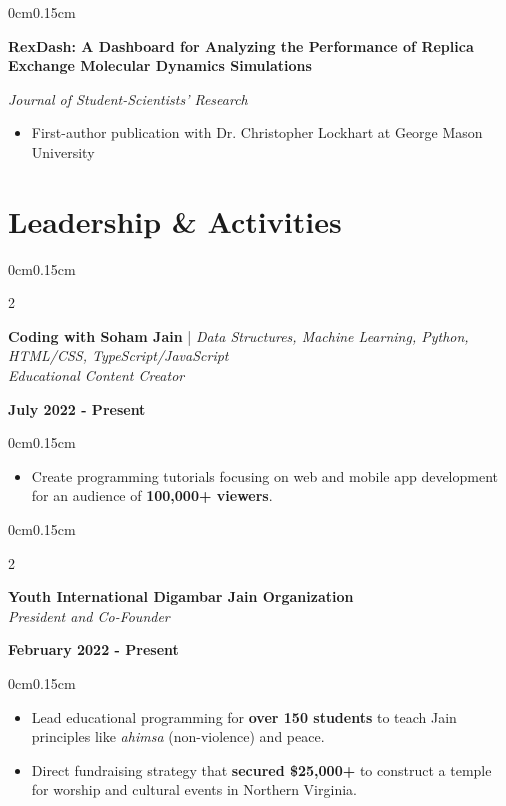 \documentclass[10pt, letterpaper]{article}
\newenvironment{highlights}{
    \begin{itemize}[topsep=0pt, parsep=0pt, partopsep=0pt, itemsep=0pt, leftmargin=0.6cm]
}{
    \end{itemize}
}
\newenvironment{onecolentry}{
    \begin{adjustwidth}{0cm}{0.15cm}
}{
    \end{adjustwidth}
}
\newenvironment{twocolentry}[2][]{
    \onecolentry
    \def\secondColumn{#2}
    \setcolumnwidth{\fill, 4cm}
    \begin{paracol}{2}
}{
    \switchcolumn \raggedleft \secondColumn
    \end{paracol}
    \endonecolentry
}
\begin{document}
    \vspace{0.05cm}

    \begin{onecolentry}
        \textbf{RexDash: A Dashboard for Analyzing the Performance of Replica Exchange Molecular Dynamics Simulations}
        
        \textit{Journal of Student-Scientists' Research}
        \begin{highlights}
            \item First-author publication with Dr. Christopher Lockhart at George Mason University
        \end{highlights}
    \end{onecolentry}

    \vspace{0.1cm}

    \section{Leadership \& Activities}
    \vspace{0.1cm}

    \begin{twocolentry}{\textbf{July 2022 - Present}}
        \textbf{Coding with Soham Jain} | \textit{Data Structures, Machine Learning, Python, HTML/CSS, TypeScript/JavaScript} \\
        \textit{Educational Content Creator}
    \end{twocolentry}
    \vspace{-0.1cm}
    \begin{onecolentry}
        \begin{highlights}
            \item Create programming tutorials focusing on web and mobile app development for an audience of \textbf{100,000+ viewers}.
        \end{highlights}
    \end{onecolentry}

    \vspace{0.05cm}
    
    \begin{twocolentry}{\textbf{February 2022 - Present}}
        \textbf{Youth International Digambar Jain Organization} \\
        \textit{President and Co-Founder}
    \end{twocolentry}
    \vspace{-0.1cm}
    \begin{onecolentry}
        \begin{highlights}
            \item Lead educational programming for \textbf{over 150 students} to teach Jain principles like \textit{ahimsa} (non-violence) and peace.
            \item Direct fundraising strategy that \textbf{secured \$25,000+} to construct a temple for worship and cultural events in Northern Virginia.
        \end{highlights}
    \end{onecolentry}
\end{document}
